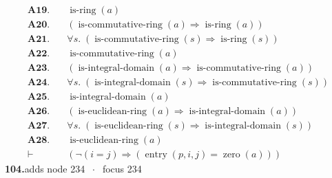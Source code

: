 \documentclass[11pt]{article}
\theoremstyle{plain}
\newcommand{\fit}[1]{\resizebox{\ifdim\width>\linewidth\linewidth\else\width\fi}{!}{#1}}
\begin{document}
\begin{align*}
  \mathbf{A19.}\quad & \operatorname{is\text{-}ring}(a) \\
  \mathbf{A20.}\quad & (\operatorname{is\text{-}commutative\text{-}ring}(a) \Rightarrow \operatorname{is\text{-}ring}(a)) \\
  \mathbf{A21.}\quad & \forall s.\; (\operatorname{is\text{-}commutative\text{-}ring}(s) \Rightarrow \operatorname{is\text{-}ring}(s)) \\
  \mathbf{A22.}\quad & \operatorname{is\text{-}commutative\text{-}ring}(a) \\
  \mathbf{A23.}\quad & (\operatorname{is\text{-}integral\text{-}domain}(a) \Rightarrow \operatorname{is\text{-}commutative\text{-}ring}(a)) \\
  \mathbf{A24.}\quad & \forall s.\; (\operatorname{is\text{-}integral\text{-}domain}(s) \Rightarrow \operatorname{is\text{-}commutative\text{-}ring}(s)) \\
  \mathbf{A25.}\quad & \operatorname{is\text{-}integral\text{-}domain}(a) \\
  \mathbf{A26.}\quad & (\operatorname{is\text{-}euclidean\text{-}ring}(a) \Rightarrow \operatorname{is\text{-}integral\text{-}domain}(a)) \\
  \mathbf{A27.}\quad & \forall s.\; (\operatorname{is\text{-}euclidean\text{-}ring}(s) \Rightarrow \operatorname{is\text{-}integral\text{-}domain}(s)) \\
  \mathbf{A28.}\quad & \operatorname{is\text{-}euclidean\text{-}ring}(a) \\
  \vdash\quad & (\neg (i = j) \Rightarrow (\operatorname{entry}(p, i, j) = \operatorname{zero}(a)))
\end{align*}
\medskip\noindent\textbf{104.}\quad \fit{\texttt{(di)}}\hfill{\small adds node 234 $\;\cdot\;$ focus 234}\\[2pt]
\end{document}
